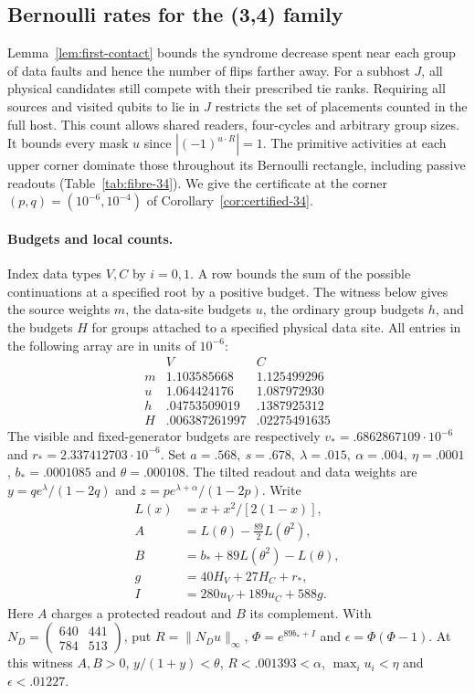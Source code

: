 \documentclass[10pt,twocolumn]{article}
\theoremstyle{definition}
\begin{document}
\subsection{Bernoulli rates for the (3,4) family}\label{app:low-degree}
Lemma~\ref{lem:first-contact} bounds the syndrome decrease spent near
each group of data faults and hence the number of flips farther away.
For a subhost $J$, all physical candidates still compete with their
prescribed tie ranks. Requiring all sources and visited qubits to lie
in $J$ restricts the set of placements counted in the full host.
This count allows shared readers, four-cycles and arbitrary group
sizes. It bounds every mask $u$ since $|(-1)^{u\cdot R}|=1$. The
primitive activities at each upper corner dominate those throughout
its Bernoulli rectangle, including passive readouts
(Table~\ref{tab:fibre-34}). We give the certificate at the corner
$(p,q)=(10^{-6},10^{-4})$ of Corollary~\ref{cor:certified-34}.

\paragraph{Budgets and local counts.}
Index data types $V,C$ by $i=0,1$. A row bounds the sum of the
possible continuations at a specified root by a positive budget.
The witness below gives the source weights $m$, the data-site
budgets $u$, the ordinary group budgets $h$, and the budgets $H$
for groups attached to a specified physical data site. All entries
in the following array are in units of $10^{-6}$:
\[
\begin{array}{c|rr}
 & V&C\\ \hline
 m&1.103585668&1.125499296\\
 u&1.064424176&1.087972930\\
 h&.04753509019&.1387925312\\
 H&.006387261997&.02275491635
\end{array}
\]
The visible and fixed-generator budgets are respectively
$v_*=.6862867109\cdot10^{-6}$ and $r_*=2.337412703\cdot10^{-6}$.
Set $a=.568,\ s=.678,\ \lambda=.015,\ \alpha=.004,\ \eta=.0001$,
$b_*=.0001085$ and $\theta=.000108$. The tilted readout and data
weights are $y=q e^\lambda/(1-2q)$ and
$z=p e^{\lambda+\alpha}/(1-2p)$. Write
\[
\begin{aligned}
 L(x)&=x+x^2/[2(1-x)],\\
 A&=L(\theta)-\tfrac{89}{2}L(\theta^2),\\
 B&=b_*+89L(\theta^2)-L(\theta),\\
 g&=40H_V+27H_C+r_*,\\
 I&=280u_V+189u_C+588g .
\end{aligned}
\]
Here $A$ charges a protected readout and $B$ its complement.
With $N_D=\left(\begin{smallmatrix}640&441\\784&513\end{smallmatrix}\right)$,
put $R=\|N_Du\|_\infty$, $\Phi=e^{89b_*+I}$ and
$\epsilon=\Phi(\Phi-1)$. At this witness $A,B>0$,
$y/(1+y)<\theta$, $R<.001393<\alpha$, $\max_i u_i<\eta$
and $\epsilon<.01227$.
\end{document}
